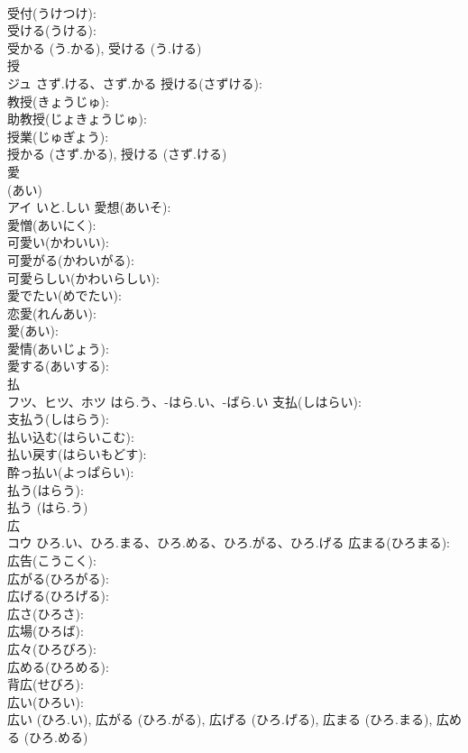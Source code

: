 \documentclass[8pt]{extreport}
\begin{document}
\begin{CJK}{UTF8}{min}
\\	受付(うけつけ): 
\\	受ける(うける): 
\\	受かる (う.かる), 受ける (う.ける)
\\	授			
\\	ジュ	さず.ける、さず.かる	授ける(さずける): 
\\	教授(きょうじゅ): 
\\	助教授(じょきょうじゅ): 
\\	授業(じゅぎょう): 
\\	授かる (さず.かる), 授ける (さず.ける)
\\	愛			
\\	(あい) 
\\	アイ	いと.しい	愛想(あいそ): 
\\	愛憎(あいにく): 
\\	可愛い(かわいい): 
\\	可愛がる(かわいがる): 
\\	可愛らしい(かわいらしい): 
\\	愛でたい(めでたい): 
\\	恋愛(れんあい): 
\\	愛(あい): 
\\	愛情(あいじょう): 
\\	愛する(あいする): 
\\	払			
\\	フツ、ヒツ、ホツ	はら.う、-はら.い、-ばら.い	支払(しはらい): 
\\	支払う(しはらう): 
\\	払い込む(はらいこむ): 
\\	払い戻す(はらいもどす): 
\\	酔っ払い(よっぱらい): 
\\	払う(はらう): 
\\	払う (はら.う)
\\	広			
\\	コウ	ひろ.い、ひろ.まる、ひろ.める、ひろ.がる、ひろ.げる	広まる(ひろまる): 
\\	広告(こうこく): 
\\	広がる(ひろがる): 
\\	広げる(ひろげる): 
\\	広さ(ひろさ): 
\\	広場(ひろば): 
\\	広々(ひろびろ): 
\\	広める(ひろめる): 
\\	背広(せびろ): 
\\	広い(ひろい): 
\\	広い (ひろ.い), 広がる (ひろ.がる), 広げる (ひろ.げる), 広まる (ひろ.まる), 広める (ひろ.める)

\end{CJK}
\end{document}
